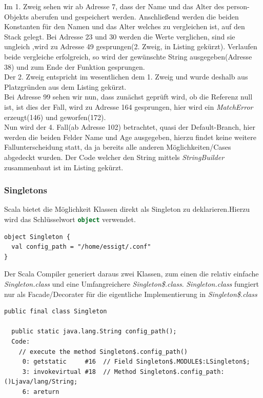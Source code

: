 \documentclass[a4paper, 11pt]{article}
\begin{document}
    Im 1. Zweig sehen wir ab Adresse 7, dass der Name und das Alter des person-Objekts aberufen und gespeichert werden. Anschließend werden die beiden Konstanten für den Namen und das Alter welches zu vergleichen ist, auf den Stack gelegt. Bei Adresse 23 und 30 werden die Werte verglichen, sind sie ungleich ,wird zu Adresse 49 gesprungen(2. Zweig, in Listing gekürzt). Verlaufen beide vergleiche erfolgreich, so wird der gewünschte String ausgegeben(Adresse 38) und zum Ende der Funktion gesprungen. \\
    
	Der 2. Zweig entspricht im wesentlichen dem 1. Zweig und wurde deshalb aus Platzgründen aus dem Listing gekürzt.\\
	
	Bei Adresse 99 sehen wir nun, dass zunächst geprüft wird, ob die Referenz null ist, ist dies der Fall, wird zu Adresse 164 gesprungen, hier wird ein \textit{MatchError} erzeugt(146) und geworfen(172).\\
	
	Nun wird der 4. Fall(ab Adresse 102) betrachtet, quasi der Default-Branch, hier werden die beiden Felder Name und Age ausgegeben, hierzu findet keine weitere Fallunterscheidung statt, da ja bereits alle anderen Möglichkeiten/Cases abgedeckt wurden. Der Code welcher den String mittels \textit{StringBuilder} zusammenbaut ist im Listing gekürzt.
    
	  
	  \subsubsection{Singletons}
	  Scala bietet die Möglichkeit Klassen direkt als Singleton zu deklarieren.Hierzu wird das Schlüsselwort \lstinline[language=scala]|object| verwendet.
	  \lstset{language=Scala}
	  \begin{lstlisting}
object Singleton {
  val config_path = "/home/essigt/.conf"
}
	  \end{lstlisting}
	  Der Scala Compiler generiert daraus zwei Klassen, zum einen die relativ einfache \textit{Singleton.class} und eine Umfangreichere \textit{Singleton\$.class}.
	  \textit{Singleton.class} fungiert nur als Facade/Decorater für die eigentliche Implementierung in \textit{Singleton\$.class}
	  
	  \lstset{language=JVMIS}
	  \begin{lstlisting}
public final class Singleton

  public static java.lang.String config_path();
  Code:
    // execute the method Singleton$.config_path()
     0: getstatic     #16  // Field Singleton$.MODULE$:LSingleton$;
     3: invokevirtual #18  // Method Singleton$.config_path:()Ljava/lang/String;
     6: areturn
\end{lstlisting}	  
	  
\end{document}
